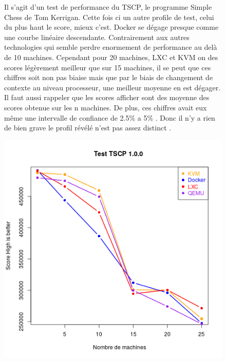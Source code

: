\begin{figure}[h]
   \begin{minipage}[c]{.46\linewidth}
	 Il s'agit d'un test de performance du TSCP, le programme Simple Chess de Tom Kerrigan. Cette fois ci un autre profile de test, celui du plus haut le score, mieux c'est. Docker se dégage presque comme une courbe linéaire descendante. Contrairement aux autres technologies qui semble perdre enormement de performance au delà de 10 machines. Cependant pour 20 machines, LXC et KVM on des scores légèrement meilleur que sur 15 machines, il se peut que ces chiffres soit non pas biaise mais que par le biais de changement de contexte au niveau processeur, une meilleur moyenne en est dégager. Il faut aussi rappeler que les scores afficher sont des moyenne des scores obtenue sur les n machines. De plus, ces chiffres avait eux même une intervalle de confiance de 2.5\% a 5\% . Donc il n'y a rien de bien grave le profil révélé n'est pas assez distinct .
   \end{minipage} \hfill
   \begin{minipage}[c]{.46\linewidth}
   	  
       \includegraphics[scale=0.55]{resultats/TSCP.png}
   \end{minipage}
\end{figure}



\newpage
